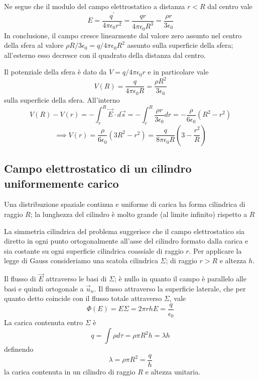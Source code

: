 \documentclass[class=book, crop=false, oneside, 12pt]{standalone}
\begin{document}
Ne segue che il modulo del campo elettrostatico a distanza \(r < R\) dal centro vale
\begin{equation*}
    E = \frac{q^{\prime}}{4 \pi \epsilon_0 r^2} = \frac{q r }{4 \pi \epsilon_0 R^3} = \frac{\rho r}{3 \epsilon_0}
\end{equation*}
In conclusione, il campo cresce linearmente dal valore zero assunto nel centro della sfera al valore \(\rho R / 3 \epsilon_0 = q / 4 \pi \epsilon_0 R^2\) assunto sulla superficie della sfera; all'esterno esso decresce con il quadrato della distanza dal centro.

Il potenziale della sfera è dato da \(V = q / 4 \pi \epsilon_0 r\) e in particolare vale
\begin{equation*}
    V(R) = \frac{q}{4 \pi \epsilon_0 R} = \frac{\rho R^2}{3 \epsilon_0}
\end{equation*}
sulla superficie della sfera. All'interno
\begin{equation*}
    V(R) - V(r) = - \int_r^R \overrightarrow{E} \cdot d \overrightarrow{s} = - \int_r^R \frac{\rho r}{3 \epsilon_0} dr = - \frac{\rho}{6 \epsilon_0} (R^2 - r^2)
\end{equation*}
\begin{equation*}
    \implies V(r) = \frac{\rho}{6 \epsilon_0} (3 R^2 - r^2) = \frac{q}{8 \pi \epsilon_0 R} \left(3 - \frac{r^2}{R}\right)
\end{equation*}
\subsection{Campo elettrostatico di un cilindro uniformemente carico}

Una distribuzione spaziale continua e uniforme di carica ha forma cilindrica di raggio \(R\); la lunghezza del cilindro è molto grande (al limite infinito) rispetto a \(R\) 

La simmetria cilindrica del problema suggerisce che il campo elettrostatico sia diretto in ogni punto ortogonalmente all'asse del cilindro formato dalla carica e sia costante su ogni superficie cilindrica coassiale di raggio \(r\).
Per applicare la legge di Gauss consideriamo una scatola cilindrica \(\Sigma\); di raggio \(r > R\) e altezza \(h\).

Il flusso di \(\overrightarrow{E}\) attraverso le basi di \(\Sigma\); è nullo in quanto il campo è parallelo alle basi e quindi ortogonale a \(\overrightarrow{u}_n\). 
Il flusso attraverso la superficie laterale, che per quanto detto coincide con il flusso totale attraverso \(\Sigma\), vale
\begin{equation*}
    \Phi(E) = E \Sigma = 2 \pi r h E = \frac{q}{\epsilon_0}
\end{equation*} 
La carica contenuta entro \(\Sigma\) è 
\begin{equation*}
    q = \int \rho d \tau = \rho \pi R^2 h = \lambda h
\end{equation*}
definendo
\begin{equation*}
    \lambda = \rho \pi R^2 = \frac{q}{h}
\end{equation*}
la carica contenuta in un cilindro di raggio \(R\) e altezza unitaria.
\end{document}
